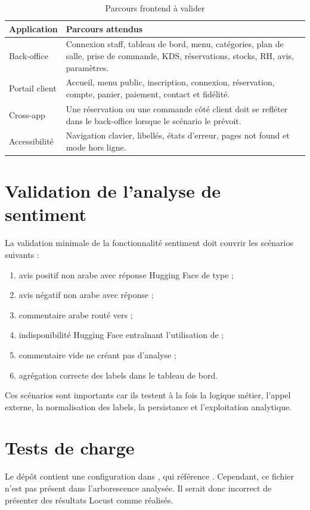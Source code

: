 \begin{table}[H]
\centering
\caption{Parcours frontend à valider}
\label{tab:tests-frontend}
\begin{tabularx}{\textwidth}{p{3.4cm}Y}
\toprule
\textbf{Application} & \textbf{Parcours attendus} \\
\midrule
Back-office & Connexion staff, tableau de bord, menu, catégories, plan de salle, prise de commande, KDS, réservations, stocks, RH, avis, paramètres. \\
Portail client & Accueil, menu public, inscription, connexion, réservation, compte, panier, paiement, contact et fidélité. \\
Cross-app & Une réservation ou une commande côté client doit se refléter dans le back-office lorsque le scénario le prévoit. \\
Accessibilité & Navigation clavier, libellés, états d'erreur, pages not found et mode hors ligne. \\
\bottomrule
\end{tabularx}
\end{table}

\section{Validation de l'analyse de sentiment}
La validation minimale de la fonctionnalité sentiment doit couvrir les scénarios suivants :

\begin{enumerate}
  \item avis positif non arabe avec réponse Hugging Face de type  ;
  \item avis négatif non arabe avec réponse  ;
  \item commentaire arabe routé vers  ;
  \item indisponibilité Hugging Face entraînant l'utilisation de  ;
  \item commentaire vide ne créant pas d'analyse ;
  \item agrégation correcte des labels dans le tableau de bord.
\end{enumerate}

Ces scénarios sont importants car ils testent à la fois la logique métier, l'appel externe, la normalisation des labels, la persistance et l'exploitation analytique.

\section{Tests de charge}
Le dépôt contient une configuration  dans , qui référence . Cependant, ce fichier n'est pas présent dans l'arborescence analysée. Il serait donc incorrect de présenter des résultats Locust comme réalisés.

